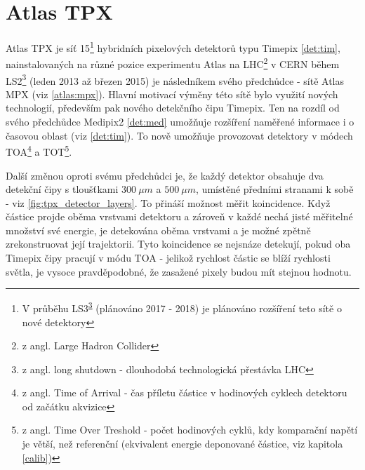 

\chapter{Atlas TPX}\label{atlas}
Atlas TPX je síť 15\footnote{V průběhu LS3\textsuperscript{\ref{ls}} (plánováno 2017 - 2018) je plánováno rozšíření teto sítě o nové detektory} hybridních pixelových detektorů typu Timepix \ref{det:tim}, nainstalovaných na různé pozice experimentu Atlas na LHC\footnote{z angl. Large Hadron Collider} v CERN během LS2\footnote{\label{ls}z angl. long shutdown - dlouhodobá technologická přestávka LHC} (leden 2013 až březen 2015) je následníkem svého předchůdce - sítě Atlas MPX (viz \ref{atlas:mpx}). Hlavní motivací výměny této sítě bylo využití nových technologií, především pak nového detekčního čipu Timepix. Ten na rozdíl od svého předchůdce Medipix2 \ref{det:med} umožňuje rozšíření naměřené informace i o časovou oblast (viz \ref{det:tim}). To nově umožňuje provozovat detektory v módech TOA\footnote{z angl. Time of Arrival - čas příletu částice v hodinových cyklech detektoru od začátku akvizice} a TOT\footnote{z angl. Time Over Treshold - počet hodinových cyklů, kdy komparační napětí je větší, než referenční (ekvivalent energie deponované částice, viz kapitola \ref{calib})}. 

Další změnou oproti svému předchůdci je, že každý detektor obsahuje dva detekční čipy s tloušťkami $300~\mu m$ a $500~\mu m$, umístěné předními stranami k sobě - viz \ref{fig:tpx_detector_layers}. To přináší možnost měřit koincidence. Když částice projde oběma vrstvami  detektoru a zároveň v každé nechá jisté měřitelné množství své energie, je detekována oběma vrstvami a je možné zpětně zrekonstruovat její trajektorii. Tyto koincidence se nejsnáze detekují, pokud oba Timepix čipy pracují v módu TOA - jelikož rychlost částic se blíží rychlosti světla, je vysoce pravděpodobné, že zasažené pixely budou mít stejnou hodnotu.


